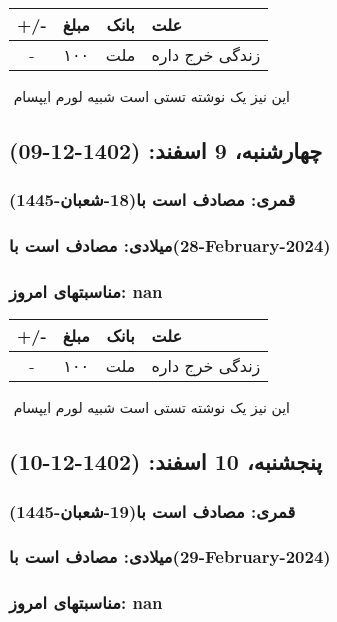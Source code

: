 \documentclass{article}
\newcommand{\rnote}[1]{\marginpar{\textcolor{color}{\StrSubstitute{\##1}{ }{\_}}}}
\newcommand{\myRow}[4]{
    #1 & #2 & #3 & #4 \\ \hline
}
\begin{document}
\begin{tabular}{ | c | c | c | p{5cm} |}
    \hline
    \myRow{ +/- }{مبلغ}{بانک}{علت}
    \myRow{-}{۱۰۰}{ملت}{زندگی خرج داره}
\end{tabular}
\newline
\newline

‌
\rnote{تست}
این نیز یک نوشته تستی است شبیه لورم ایپسام




\newpage
{}
\textcolor{color}{
\section{ چهارشنبه، 9 اسفند: (1402-12-09) }
\subsubsection*{قمری: مصادف است با(18-شعبان-1445)} 
\subsubsection*{میلادی: مصادف است با(28-February-2024)}
\subsubsection*{مناسبتهای امروز: nan}
}


\begin{tabular}{ | c | c | c | p{5cm} |}
    \hline
    \myRow{ +/- }{مبلغ}{بانک}{علت}
    \myRow{-}{۱۰۰}{ملت}{زندگی خرج داره}
\end{tabular}
\newline
\newline

‌
\rnote{تست}
این نیز یک نوشته تستی است شبیه لورم ایپسام




\newpage
{}
\textcolor{color}{
\section{ پنجشنبه، 10 اسفند: (1402-12-10) }
\subsubsection*{قمری: مصادف است با(19-شعبان-1445)} 
\subsubsection*{میلادی: مصادف است با(29-February-2024)}
\subsubsection*{مناسبتهای امروز: nan}
}
\end{document}
